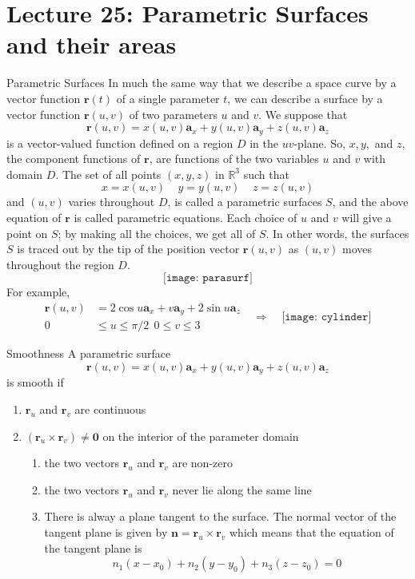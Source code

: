 \documentclass[10pt]{beamer}
\begin{document}
\section{Lecture 25: Parametric Surfaces and their areas} 
\begin{frame}[allowframebreaks]{Parametric Surfaces}
In much the same way that we describe a space curve by a vector function $\mathbf{r}(t)$ of a single
parameter $t$, we can describe a surface by a vector function $\mathbf{r}(u,v)$ of two parameters $u$ and $v$. We suppose that
$$\mathbf{r}(u,v) = x(u,v)\mathbf{a}_x +y(u,v)\mathbf{a}_y + z(u,v)\mathbf{a}_z$$
is a vector-valued function defined on a region $D$ in the $uv$-plane. So, $x, y,$ and $z$, the component functions of $\mathbf{r}$, are functions of the two variables $u$ and $v$ with domain $D$. The set of all points $(x, y, z)$ in $\mathbb{R}^3$ such that 
$$x = x(u,v)~~~~~y = y(u,v)~~~~~z = z(u,v)$$
and $(u,v)$ varies throughout $D$, is called a {\color{red} parametric surfaces} $S$, and the above equation of $\mathbf{r}$ is called {\color{red}parametric equations}. Each choice of $u$ and $v$ will give a point on $S$; by making all the choices, we get all of $S$. In other words, the surfaces $S$ is traced out by the tip of the position vector $\mathbf{r}(u,v)$ as $(u,v)$ moves throughout the region $D$.
$$\texttt{[image: parasurf]}$$
For example, 
\[\begin{aligned}
\mathbf{r}(u,v) &= 2\cos u\mathbf{a}_x + v\mathbf{a}_y + 2\sin u\mathbf{a}_z \\
0&\leq u\leq \pi/2~~0\leq v\leq 3
\end{aligned}~~~\Rightarrow~~~
\begin{aligned}
\texttt{[image: cylinder]}
\end{aligned}\]

\end{frame}


\begin{frame}[allowframebreaks]{Smoothness}
A parametric surface 
$$\mathbf{r}(u,v) = x(u,v)\mathbf{a}_x +y(u,v)\mathbf{a}_y + z(u,v)\mathbf{a}_z$$
is {\color{red}smooth} if 
\begin{enumerate}
	\item $\mathbf{r}_u$ and $\mathbf{r}_v$ are continuous
	\item $(\mathbf{r}_u\times\mathbf{r}_v)\neq\mathbf{0}$ on the interior of the parameter domain
	\begin{enumerate}
		\item the two vectors $\mathbf{r}_u$ and $\mathbf{r}_v$ are non-zero
		\item the two vectors $\mathbf{r}_u$ and $\mathbf{r}_v$ never lie along the same line
		\item There is alway a plane tangent to the surface. The normal vector of the tangent plane is given by $\mathbf{n} = \mathbf{r}_u\times\mathbf{r}_v$ which means that the equation of the tangent plane is $$n_1(x-x_0) + n_2(y-y_0) + n_3(z-z_0) = 0$$
	\end{enumerate}
\end{enumerate}
\end{frame}
\end{document}
